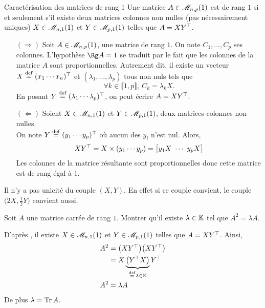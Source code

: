 \begin{prop}{Caractérisation des matrices de rang $1$} 
    Une matrice $A \in \mathscr{M}_{n,p}(1)$ est de rang $1$ si et seulement s'il existe deux matrices colonnes non nulles (pas nécessairement uniques) $X \in \mathscr{M}_{n,1}(1)$ et $Y \in \mathscr{M}_{p,1}(1)$ telles que $A = X Y^\top$. 
\end{prop}

\begin{preuve}
    \begin{itemize}
        \item[$(\Rightarrow)$] Soit $A \in \mathscr{M}_{n,p}(1)$, une matrice de rang $1$. On note $C_1, \dots, C_p$ ses colonnes. L'hypothèse $\Rg A = 1$ se traduit par le fait que les colonnes de la matrice $A$ sont proportionnelles. Autrement dit, il existe un vecteur $X \overset{\mathrm{\tiny def}}{=} (x_1 \cdots x_n)^\top$ et $(\lambda_1, \dots, \lambda_p)$ tous non nuls tels que 
        $$\forall k \in \llbracket 1, p \rrbracket,\ C_k = \lambda_k X.$$
        En posant $Y \overset{\mathrm{\tiny def}}{=} (\lambda_1 \cdots \lambda_p)^\top$, on peut écrire $A = X Y^\top$.
        \item[$(\Leftarrow)$] Soient $X \in \mathscr{M}_{n,1}(1)$ et $Y \in \mathscr{M}_{p,1}(1)$, deux matrices colonnes non nulles. \\
        On note $Y \overset{\mathrm{\tiny def}}{=} (y_1 \cdots y_p)^\top$ où aucun des $y_i$ n'est nul. Alors,
        $$
        X Y^\top = X
        \times
        (y_1 \cdots y_p)
         = \big[y_1 X \ \cdots \ y_p X \big]
        $$
        Les colonnes de la matrice résultante sont proportionnelles donc cette matrice est de rang égal à $1$. 
    \end{itemize}
\end{preuve}

\begin{remarque}
    Il n'y a pas unicité du couple $(X, Y)$. En effet si ce couple convient, le couple $\big(2X, \frac{1}{2}Y \big)$ convient aussi.
\end{remarque}

\begin{exercice} 
    Soit $A$ une matrice carrée de rang $1$. Montrer qu'il existe $\lambda \in \mathbb{K}$ tel que $A^2 = \lambda A$.
\end{exercice}

\begin{solution}
    D'après , il existe $X \in \mathscr{M}_{n,1}(1)$ et $Y \in \mathscr{M}_{p,1}(1)$ telles que $A = X Y^\top$. Ainsi, 
    \begin{align*}
        A^2 &= \big(X Y^\top\big) \big(X Y^\top\big) \\
        &= X \underbrace{\big( Y^\top X \big)}_{ \overset{\mathrm{\tiny def}}{=} \lambda \in \mathbb{K}} Y^\top \\
        A^2 &= \lambda A
    \end{align*}
    De plus $\lambda = \Tr A$.
\end{solution}

